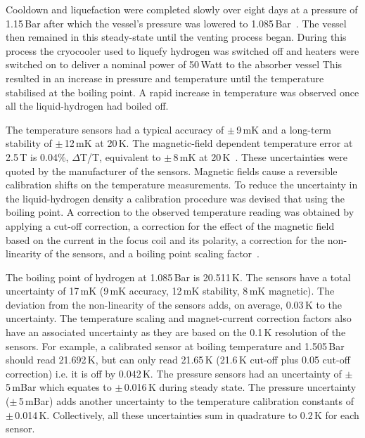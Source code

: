 Cooldown and liquefaction were completed slowly over eight days at a
pressure of 1.15\,Bar after which the vessel's pressure was lowered to
1.085\,Bar~\cite{1748-0221-13-09-T09008}.
The vessel then remained in this steady-state until the
venting process began.
During this process the cryocooler used to liquefy hydrogen was
switched off and heaters were switched on to deliver a nominal power
of 50\,Watt to the absorber vessel
This resulted in an increase in pressure and temperature until the
temperature stabilised at the boiling point.
A rapid increase in temperature was observed once all the
liquid-hydrogen had boiled off. 

The temperature sensors had a typical accuracy of
$\mathrm{\pm}$\,9\,mK and a long-term stability of
$\mathrm{\pm}$\,12\,mK at 20\,K.
The magnetic-field dependent temperature error at 2.5\,T is 0.04\%,
$\Delta$T/T, equivalent to $\mathrm{\pm}$\,8\,mK at
20\,K~\cite{CernoxRTDs}\cite{TemperatureMeasurement}.
These uncertainties were quoted by the manufacturer of the sensors.
Magnetic fields cause a reversible calibration shifts on the temperature
measurements.
To reduce the uncertainty in the liquid-hydrogen density a calibration
procedure was devised that using the boiling point.
A correction to the observed temperature reading was obtained by
applying a cut-off correction, a correction for the effect of the
magnetic field based on the current in the focus coil and its
polarity, a correction for the non-linearity of the sensors, and a 
boiling point scaling factor~\cite{NOTE524}.  
 
The boiling point of hydrogen at 1.085\,Bar is 20.511\,K.
The sensors have a total uncertainty of 17\,mK (9\,mK accuracy, 12\,mK
stability, 8\,mK magnetic).
The deviation from the non-linearity of the sensors adds, on average,
0.03\,K to the uncertainty.
The temperature scaling and magnet-current correction factors also
have an associated uncertainty as they are based on the 0.1\,K
resolution of the sensors.  
For example, a calibrated sensor at boiling temperature and 1.505\,Bar
should read 21.692\,K, but can only read 21.65\,K (21.6\,K cut-off
plus 0.05 cut-off correction) i.e. it is off by 0.042\,K.
The pressure sensors had an uncertainty of $\mathrm{\pm}$\,5\,mBar
which equates to $\mathrm{\pm}$\,0.016\,K during steady state.
The pressure uncertainty ($\mathrm{\pm}$\,5\,mBar) adds another
uncertainty to the temperature calibration constants of
$\mathrm{\pm}$\,0.014\,K.
Collectively, all these uncertainties sum in quadrature to 0.2\,K for
each sensor.
 
